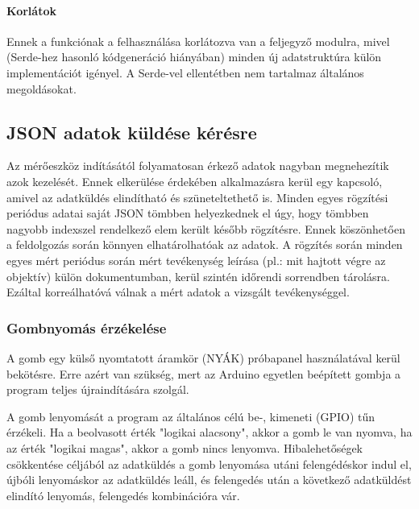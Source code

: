 \paragraph{Korlátok}

Ennek a funkciónak a felhasználása korlátozva van a feljegyző modulra, mivel (Serde-hez hasonló kódgeneráció hiányában) minden új adatstruktúra külön implementációt igényel.
A Serde-vel ellentétben nem tartalmaz általános megoldásokat.

\subsection{JSON adatok küldése kérésre}
Az mérőeszköz indításától folyamatosan érkező adatok nagyban megnehezítik azok kezelését.
Ennek elkerülése érdekében alkalmazásra kerül egy kapcsoló, amivel az adatküldés elindítható és szüneteltethető is.
Minden egyes rögzítési periódus adatai saját JSON tömbben helyezkednek el úgy, hogy tömbben nagyobb indexszel rendelkező elem került később rögzítésre.
Ennek köszönhetően a feldolgozás során könnyen elhatárolhatóak az adatok.
A rögzítés során minden egyes mért periódus során mért tevékenység leírása (pl.: mit hajtott végre az objektív) külön dokumentumban, kerül szintén időrendi sorrendben tárolásra.
Ezáltal korreálhatóvá válnak a mért adatok a vizsgált tevékenységgel.

\subsubsection{Gombnyomás érzékelése}
A gomb egy külső nyomtatott áramkör (NYÁK) próbapanel használatával kerül bekötésre.
Erre azért van szükség, mert az Arduino egyetlen beépített gombja a program teljes újraindítására szolgál.

A gomb lenyomását a program az általános célú be-, kimeneti (GPIO) tűn érzékeli.
Ha a beolvasott érték "logikai alacsony", akkor a gomb le van nyomva, ha az érték "logikai magas", akkor a gomb nincs lenyomva.
Hibalehetőségek csökkentése céljából az adatküldés a gomb lenyomása utáni felengédéskor indul el,
újbóli lenyomáskor az adatküldés leáll, és felengedés után a következő adatküldést elindító lenyomás, felengedés kombinációra vár.
